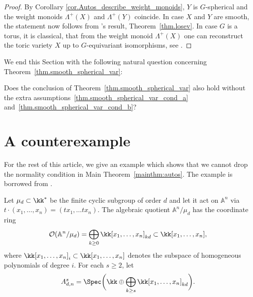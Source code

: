 \begin{proof}
By Corollary \ref{cor.Autos_describe_weight_monoids}, $Y$ is $G$-spherical
and the weight monoids
$\Lambda^+(X)$ and $\Lambda^+(Y)$ coincide.
In case $X$ and $Y$ are smooth, the statement now follows from
's result, \ie Theorem~\ref{thm.losev}.
In case $G$ is a torus, it is classical, that from the weight monoid $\Lambda^+(X)$
one can reconstruct the toric variety $X$ up to $G$-equivariant isomorphisms,
see \eg \cite[\S1.3]{Fu1993Introduction-to-to}.
\end{proof}

We end this Section with the following natural question concerning
Theorem~\ref{thm.smooth_spherical_var}:

\begin{question}
Does the conclusion of Theorem~\ref{thm.smooth_spherical_var} also hold without
the extra assumptions~\eqref{thm.smooth_spherical_var_cond_a} and~\eqref{thm.smooth_spherical_var_cond_b}?
\end{question}

\section{A counterexample}
\label{sec.Counter_example}

For the rest of this article, we give an example which shows that we cannot drop the normality condition
in Main Theorem~\ref{mainthm:autos}. The example is borrowed from \cite{Re2017Characterization-o}.

Let $\mu_d \subset \kk^\ast$ be the
finite cyclic subgroup of order $d$ and let it act on $\mathbb{A}^n$ via
$t \cdot (x_1, \ldots, x_n) = (t x_1, \ldots t x_n)$. The algebraic quotient
$\mathbb{A}^n/\mu_d$ has the coordinate ring
\[
\mathcal{O}(\mathbb{A}^n/\mu_d) = \bigoplus_{k \ge 0} \kk[x_1,\dots,x_n]_{kd}
\subset \kk[x_1, \ldots, x_n],
\]
where
$\kk[x_1,\dots,x_n]_{i} \subset \kk[x_1, \ldots, x_n]$
denotes the subspace of homogeneous polynomials of degree $i$. For each $s \geq 2$, let
\[
A_{d, n}^s = \Spec\biggl(\kk \oplus \bigoplus_{k \ge s} \kk[x_1,\dots,x_n]_{kd} \biggr).
\]

